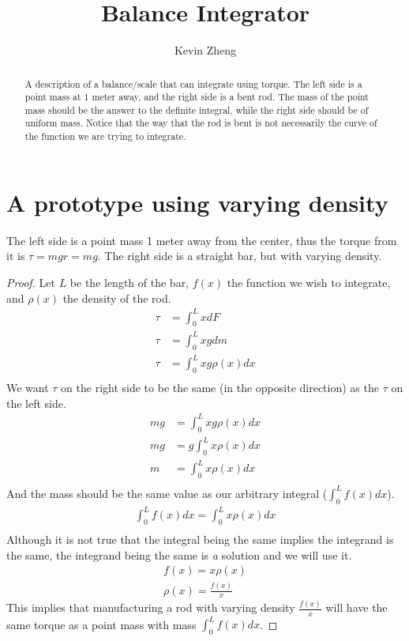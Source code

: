 \documentclass[letterpaper, 12pt]{article}
\title{Balance Integrator}
\author{Kevin Zheng}
\begin{document}
\maketitle
\begin{abstract}
	\par A description of a balance/scale that can integrate using torque.
	The left side is a point mass at 1 meter away, and the right side is a bent rod.
	The mass of the point mass should be the answer to the definite integral, while the right side should be of uniform mass. Notice that the way that the rod is bent is not necessarily the curve of the function we are trying to integrate.
\end{abstract}
\tableofcontents
\section{A prototype using varying density}
\par The left side is a point mass 1 meter away from the center, thus the torque from it is $\tau = mgr = mg$.
The right side is a straight bar, but with varying density.
\begin{center}
\end{center}
\begin{proof}
	Let $L$ be the length of the bar, $f(x)$ the function we wish to integrate, and $\rho(x)$ the density of the rod.
	\begin{align*}
		\tau &= \int_0^L xdF\\
		\tau &= \int_0^L xgdm\\
		\tau &= \int_0^L xg\rho(x)dx\\
	\end{align*}
	We want $\tau$ on the right side to be the same (in the opposite direction) as the $\tau$ on the left side.
	\begin{align*}
		mg &= \int_0^L xg\rho(x)dx\\
		mg &= g\int_0^L x\rho(x)dx\\
		m &= \int_0^L x\rho(x)dx\\
	\end{align*}
	And the mass should be the same value as our arbitrary integral ($\int_0^Lf(x)dx$).
	\begin{align*}
		\int_0^Lf(x)dx = \int_0^L x\rho(x)dx\\
	\end{align*}
	Although it is not true that the integral being the same implies the integrand is the same, the integrand being the same is \emph{a} solution and we will use it.
	\begin{align*}
		f(x) = x\rho(x)\\
		\rho(x) = \frac{f(x)}{x}
	\end{align*}
	This implies that manufacturing a rod with varying density $\frac{f(x)}{x}$ will have the same torque as a point mass with mass $\int_0^L f(x) dx$.
\end{proof}
\end{document}
